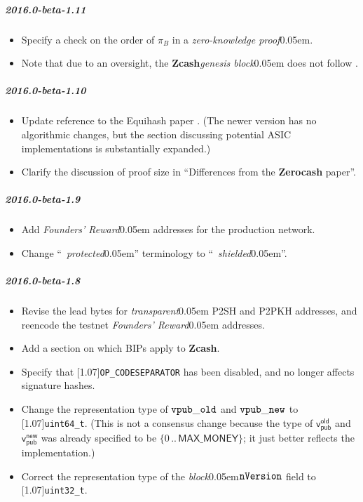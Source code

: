 \documentclass{article}
\let\oldtexttt\texttt
\let\oldmathtt\mathtt
\renewcommand{\texttt}[1]{\scalebox{1.02}[1.07]{\oldtexttt{#1}}}
\renewcommand{\mathtt}[1]{\scalebox{1.02}[1.07]{$\oldmathtt{#1}$}}
\newcommand{\introlist}{\needspace{15ex}}
\newcommand{\term}[1]{\textsl{#1}\kern 0.05em\xspace}
\newcommand{\termbf}[1]{\textbf{#1}\xspace}
\newcommand{\quotedterm}[1]{``~\!\!\term{#1}''}
\newcommand{\Zcash}{\termbf{Zcash}}
\newcommand{\Zerocash}{\termbf{Zerocash}}
\newcommand{\zeroKnowledgeProof}{\term{zero-knowledge proof}}
\newcommand{\block}{\term{block}}
\newcommand{\genesisBlock}{\term{genesis block}}
\newcommand{\transparent}{\term{transparent}}
\newcommand{\range}[2]{\{{#1}\,..\,{#2}\}}
\newcommand{\MAXMONEY}{\mathsf{MAX\_MONEY}}
\newcommand{\foundersReward}{\term{Founders' Reward}}
\newcommand{\vpubOldField}{\mathtt{vpub\_old}}
\newcommand{\vpubNewField}{\mathtt{vpub\_new}}
\newcommand{\type}[1]{\texttt{#1}}
\newcommand{\ScriptOP}[1]{\texttt{OP\_{#1}}}
\newcommand{\nVersion}{\mathtt{nVersion}}
\newcommand{\Proof}{\pi}
\newcommand{\vpubOld}{\mathsf{v_{pub}^{old}}}
\newcommand{\vpubNew}{\mathsf{v_{pub}^{new}}}
\begin{document}
\introlist
\subparagraph{2016.0-beta-1.11}

\begin{itemize}
    \item Specify a check on the order of $\Proof_B$ in a \zeroKnowledgeProof.
    \item Note that due to an oversight, the \Zcash \genesisBlock does not
          follow \cite{BIP-34}.
\end{itemize}

\introlist
\subparagraph{2016.0-beta-1.10}

\begin{itemize}
    \item Update reference to the Equihash paper \cite{BK2016}. (The newer version
          has no algorithmic changes, but the section discussing potential ASIC
          implementations is substantially expanded.)
    \item Clarify the discussion of proof size in ``Differences from the \Zerocash paper''.
\end{itemize}

\introlist
\subparagraph{2016.0-beta-1.9}

\begin{itemize}
    \item Add \foundersReward addresses for the production network.
    \item Change \quotedterm{protected} terminology to \quotedterm{shielded}.
\end{itemize}

\introlist
\subparagraph{2016.0-beta-1.8}

\begin{itemize}
    \item Revise the lead bytes for \transparent P2SH and P2PKH addresses,
          and reencode the testnet \foundersReward addresses.
    \item Add a section on which BIPs apply to \Zcash.
    \item Specify that \ScriptOP{CODESEPARATOR} has been disabled, and
          no longer affects signature hashes.
    \item Change the representation type of $\vpubOldField$ and $\vpubNewField$
          to \type{uint64\_t}. (This is not a consensus change because the type of
          $\vpubOld$ and $\vpubNew$ was already specified to be $\range{0}{\MAXMONEY}$;
          it just better reflects the implementation.)
    \item Correct the representation type of the \block $\nVersion$ field to
          \type{uint32\_t}.
\end{itemize}
\end{document}

